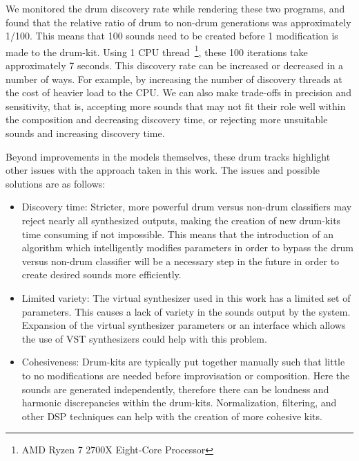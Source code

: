 \documentclass[\main/thesis.tex]{subfiles}
\begin{document}
  We monitored the drum discovery rate while rendering these two programs, and found that the relative ratio of drum to non-drum generations was approximately 1/100. This means that 100 sounds need to be created before 1 modification is made to the drum-kit. Using 1 CPU thread~\footnote{AMD Ryzen 7 2700X Eight-Core Processor}, these 100 iterations take approximately 7 seconds. This discovery rate can be increased or decreased in a number of ways. For example, by increasing the number of discovery threads at the cost of heavier load to the CPU. We can also make trade-offs in precision and sensitivity, that is, accepting more sounds that may not fit their role well within the composition and decreasing discovery time, or rejecting more unsuitable sounds and increasing discovery time. 

\begin{table}[tbp]
\caption{\label{tab:drum_prog} Parameters for each drum program.}
\end{table}

 Beyond improvements in the models themselves, these drum tracks highlight other issues with the approach taken in this work. The issues and possible solutions are as follows:
~\begin{itemize}
    \item  Discovery time: Stricter,  more  powerful  drum  versus  non-drum  classifiers may reject nearly all synthesized outputs, making the creation of new drum-kits time consuming if not impossible. This means that the introduction of an algorithm which intelligently  modifies  parameters  in  order  to  bypass  the  drum  versus  non-drum classifier will be a necessary step in the future in order to create desired sounds more efficiently.
    
    \item Limited variety: The virtual synthesizer used in this work has a limited set of parameters. This causes a lack of variety in the sounds output by the system. Expansion of the virtual synthesizer parameters or an interface which allows the use of VST synthesizers could help with this problem.
    
    \item Cohesiveness: Drum-kits are typically put together manually such that little to no modifications are needed before improvisation or composition. Here the sounds are generated independently, therefore there can be loudness and harmonic discrepancies within the drum-kits. Normalization, filtering, and other DSP techniques can help with the creation of more cohesive kits. 
\end{itemize}
\end{document}
